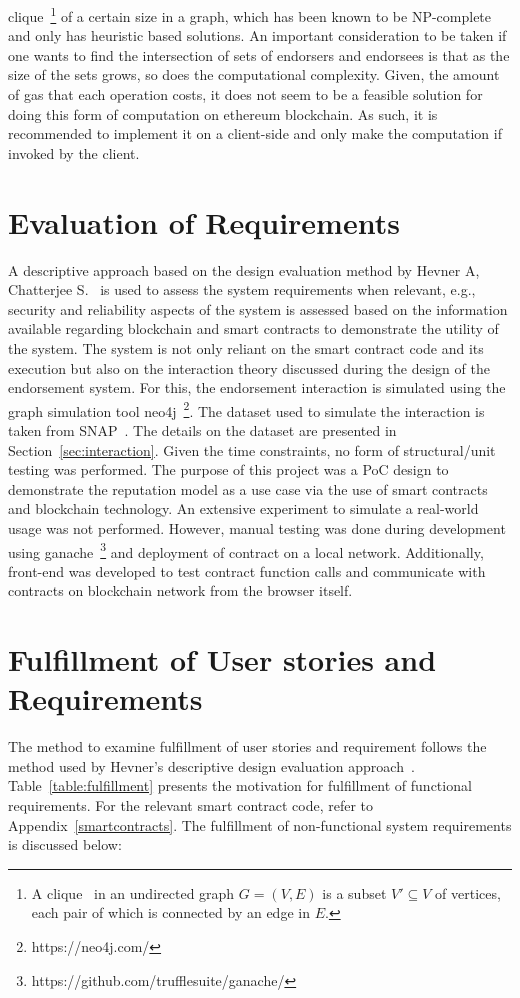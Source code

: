 clique~\footnote{A clique~\cite{cormen2009introduction} in an undirected graph
	$G = ( V,E)$ is a subset $V' \subseteq V$ of vertices, each pair of which
is connected by an edge in $E$.} of a certain size in a graph, which has been
known to be NP-complete and only has heuristic based solutions.  An important
consideration to be taken if one wants to find the intersection of sets of
endorsers and endorsees is that as the size of the sets grows, so does the
computational complexity. Given, the amount of gas that each operation costs,
it does not seem to be a feasible solution for doing this form of computation
on ethereum blockchain. As such, it is recommended to implement it on a
client-side and only make the computation if invoked by the client.

\section{Evaluation of Requirements}
A descriptive approach based on the design evaluation method by Hevner A,
Chatterjee S.~\cite{hevner2010design} is used to assess the system requirements
when relevant, e.g., security and reliability aspects of the system is assessed
based on the information available regarding blockchain and smart contracts to
demonstrate the utility of the system. The system is not only reliant on the
smart contract code and its execution but also on the interaction theory
discussed during the design of the endorsement system. For this, the
endorsement interaction is simulated using the graph simulation tool
neo4j~\footnote{https://neo4j.com/}. The dataset used to simulate the
interaction is taken from SNAP~\cite{snapnets}. The details on the dataset are
presented in Section~\ref{sec:interaction}. Given the time constraints, no form
of structural/unit testing was performed. The purpose of this project was a PoC
design to demonstrate the reputation model as a use case via the use of smart
contracts and blockchain technology. An extensive experiment to simulate a
real-world usage was not performed. However, manual testing was done during
development using ganache~\footnote{https://github.com/trufflesuite/ganache/}
and deployment of contract on a local network. Additionally, front-end was
developed to test contract function calls and communicate with contracts on
blockchain network from the browser itself.  

\section{Fulfillment of User stories and Requirements}\label{fulfillment}
The method to examine fulfillment of user stories and requirement follows the
method used by Hevner's descriptive design evaluation
approach~\cite{hevner2010design}. Table~\ref{table:fulfillment} presents
the motivation for fulfillment of functional requirements. For the relevant
smart contract code, refer to Appendix~\ref{smartcontracts}. 
The fulfillment of non-functional system requirements is discussed below:
